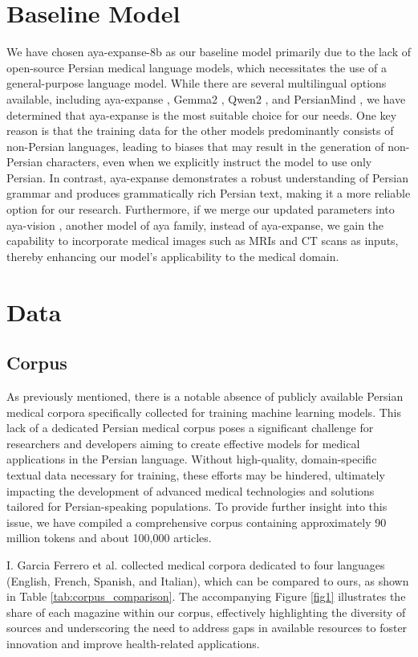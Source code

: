 \documentclass[conference]{IEEEtran}
\begin{document}
	\section{Baseline Model}
	We have chosen aya-expanse-8b as our baseline model primarily due to the lack of open-source Persian medical language models, which necessitates the use of a general-purpose language model. While there are several multilingual options available, including aya-expanse \cite{b5}, Gemma2 \cite{b15}, Qwen2 \cite{b16}, and PersianMind \cite{b17}, we have determined that aya-expanse is the most suitable choice for our needs. One key reason is that the training data for the other models predominantly consists of non-Persian languages, leading to biases that may result in the generation of non-Persian characters, even when we explicitly instruct the model to use only Persian. In contrast, aya-expanse demonstrates a robust understanding of Persian grammar and produces grammatically rich Persian text, making it a more reliable option for our research. Furthermore, if we merge our updated parameters into aya-vision
	\cite{b18}
	, another model of aya family, instead of aya-expanse, we gain the capability to incorporate medical images such as MRIs and CT scans as inputs, thereby enhancing our model’s applicability to the medical domain.
	\section{Data}
	
	\subsection{Corpus}
	As previously mentioned, there is a notable absence of publicly available Persian medical corpora specifically collected for training machine learning models. This lack of a dedicated Persian medical corpus poses a significant challenge for researchers and developers aiming to create effective models for medical applications in the Persian language. Without high-quality, domain-specific textual data necessary for training, these efforts may be hindered, ultimately impacting the development of advanced medical technologies and solutions tailored for Persian-speaking populations. To provide further insight into this issue, we have compiled a comprehensive corpus containing approximately 90 million tokens and about 100,000 articles. 
	
	I. Garcia Ferrero et al.
	\cite{b19}
	collected medical corpora dedicated to four languages (English, French, Spanish, and Italian), which can be compared to ours, as shown in Table 
	\ref{tab:corpus_comparison}.
	The accompanying Figure \ref{fig1} illustrates the share of each magazine within our corpus, effectively highlighting the diversity of sources and underscoring the need to address gaps in available resources to foster innovation and improve health-related applications.
	
\end{document}
